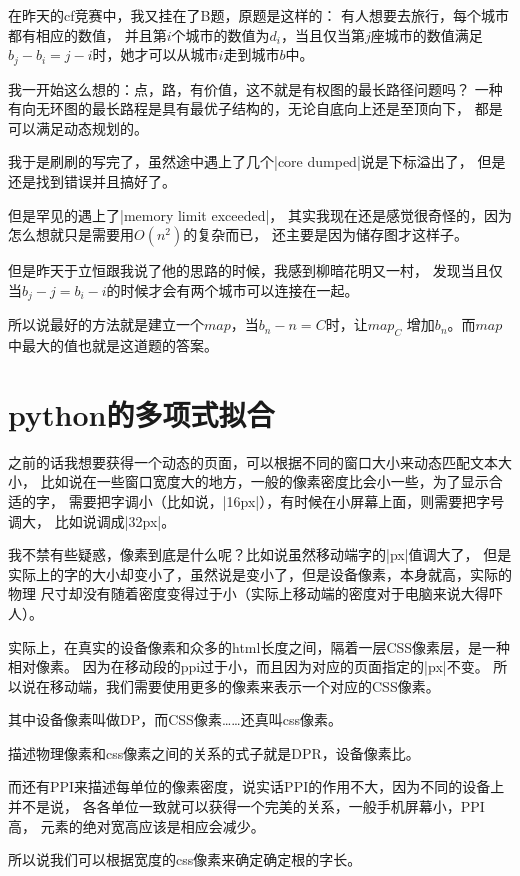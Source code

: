 在昨天的cf竞赛中，我又挂在了B题，原题是这样的：
有人想要去旅行，每个城市都有相应的数值，
并且第$i$个城市的数值为$d_i$，当且仅当第$j$座城市的数值满足
$b_j-b_i=j-i$时，她才可以从城市$i$走到城市$b$中。

我一开始这么想的：点，路，有价值，这不就是有权图的最长路径问题吗？
一种有向无环图的最长路程是具有最优子结构的，无论自底向上还是至顶向下，
都是可以满足动态规划的。

我于是刷刷的写完了，虽然途中遇上了几个\vb|core dumped|说是下标溢出了，
但是还是找到错误并且搞好了。

但是罕见的遇上了\vb|memory limit exceeded|，
其实我现在还是感觉很奇怪的，因为怎么想就只是需要用$O(n^2)$的复杂而已，
还主要是因为储存图才这样子。

但是昨天于立恒跟我说了他的思路的时候，我感到柳暗花明又一村，
发现当且仅当$b_j-j=b_i-i$的时候才会有两个城市可以连接在一起。

所以说最好的方法就是建立一个$map$，当$b_n-n=C$时，让$map_C$
增加$b_n$。而$map$中最大的值也就是这道题的答案。


\section{python的多项式拟合}

之前的话我想要获得一个动态的页面，可以根据不同的窗口大小来动态匹配文本大小，
比如说在一些窗口宽度大的地方，一般的像素密度比会小一些，为了显示合适的字，
需要把字调小（比如说，\vb|16px|），有时候在小屏幕上面，则需要把字号调大，
比如说调成\vb|32px|。

我不禁有些疑惑，像素到底是什么呢？比如说虽然移动端字的\vb|px|值调大了，
但是实际上的字的大小却变小了，虽然说是变小了，但是设备像素，本身就高，实际的物理
尺寸却没有随着密度变得过于小（实际上移动端的密度对于电脑来说大得吓人）。

实际上，在真实的设备像素和众多的html长度之间，隔着一层CSS像素层，是一种相对像素。
因为在移动段的ppi过于小，而且因为对应的页面指定的\vb|px|不变。
所以说在移动端，我们需要使用更多的像素来表示一个对应的CSS像素。

其中设备像素叫做DP，而CSS像素\ldots\ldots 还真叫css像素。

描述物理像素和css像素之间的关系的式子就是DPR，设备像素比。

而还有PPI来描述每单位的像素密度，说实话PPI的作用不大，因为不同的设备上并不是说，
各各单位一致就可以获得一个完美的关系，一般手机屏幕小，PPI高，
元素的绝对宽高应该是相应会减少。

所以说我们可以根据宽度的css像素来确定确定根的字长。


